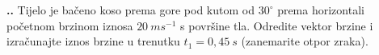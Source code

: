 
\noindent 
\textbf{
\thecjelina.\thezadatak.}
Tijelo je bačeno koso prema gore pod kutom od $30^\circ$  prema horizontali početnom brzinom iznosa $20\ ms^{-1}$  s površine tla. Odredite vektor brzine i izračunajte iznos brzine u trenutku $t_1=0,45\ s$   (zanemarite otpor zraka).


